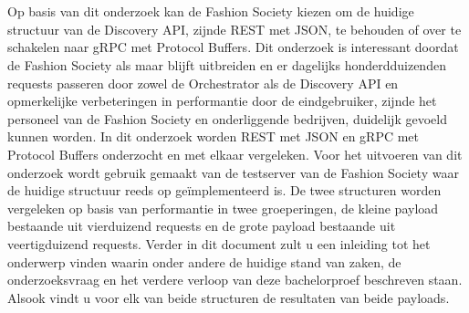 
%
%

%



\chapter*{}

Op basis van dit onderzoek kan de Fashion Society kiezen om de huidige structuur van de Discovery API, zijnde REST met JSON, te behouden of over te schakelen naar gRPC met Protocol Buffers. Dit onderzoek is interessant doordat de Fashion Society als maar blijft uitbreiden en er dagelijks honderdduizenden requests passeren door zowel de Orchestrator als de Discovery API en opmerkelijke verbeteringen in performantie door de eindgebruiker, zijnde het personeel van de Fashion Society en onderliggende bedrijven, duidelijk gevoeld kunnen worden. In dit onderzoek worden REST met JSON en gRPC met Protocol Buffers onderzocht en met elkaar vergeleken. Voor het uitvoeren van dit onderzoek wordt gebruik gemaakt van de testserver van de Fashion Society waar de huidige structuur reeds op geïmplementeerd is. De twee structuren worden vergeleken op basis van performantie in twee groeperingen, de kleine payload bestaande uit vierduizend requests en de grote payload bestaande uit veertigduizend requests. Verder in dit document zult u een inleiding tot het onderwerp vinden waarin onder andere de huidige stand van zaken, de onderzoeksvraag en het verdere verloop van deze bachelorproef beschreven staan. Alsook vindt u voor elk van beide structuren de resultaten van beide payloads.

